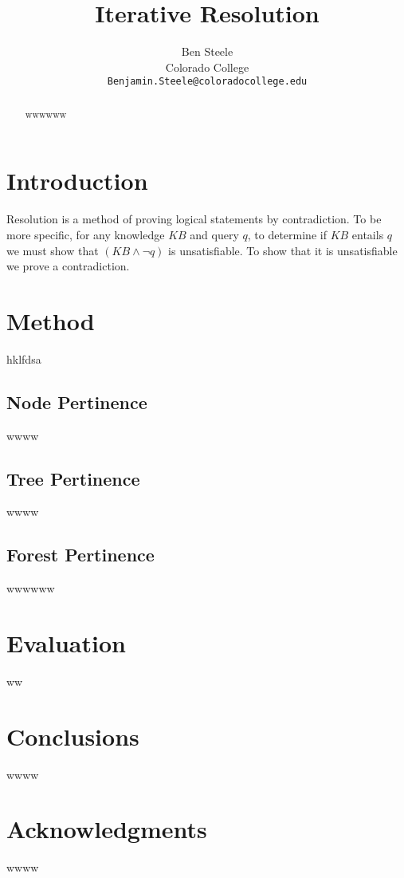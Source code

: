\documentclass[conference]{IEEEtran}
\author{
Ben Steele \\
Colorado College\\
\texttt{Benjamin.Steele@coloradocollege.edu} \\
}
\begin{document}
\title{Iterative Resolution}

\author{
}

\maketitle

\begin{abstract}
wwwwww
\end{abstract}
\section{Introduction}
Resolution is a method of proving logical statements by contradiction.  To be more specific, for any knowledge $KB$ and query $q$, to determine if $KB$ entails $q$ we must show that $(KB \land \neg q)$ is unsatisfiable.  To show that it is unsatisfiable we prove a contradiction.  
\section{Method}
hklfdsa
\subsection{Node Pertinence}
wwww\cite{AIbook}
\subsection{Tree Pertinence}
wwww
\subsection{Forest Pertinence}

 wwwwww
\section{Evaluation}
ww

\section{Conclusions}

wwww
\section{Acknowledgments}
wwww



\end{document}
